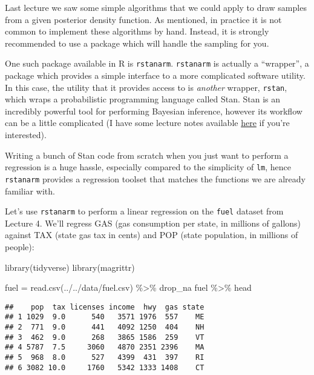\documentclass[
]{article}
\newenvironment{Shaded}{\begin{snugshade}}{\end{snugshade}}
\newcommand{\FunctionTok}[1]{\textcolor[rgb]{0.00,0.00,0.00}{#1}}
\newcommand{\NormalTok}[1]{#1}
\newcommand{\OtherTok}[1]{\textcolor[rgb]{0.56,0.35,0.01}{#1}}
\newcommand{\SpecialCharTok}[1]{\textcolor[rgb]{0.00,0.00,0.00}{#1}}
\newcommand{\StringTok}[1]{\textcolor[rgb]{0.31,0.60,0.02}{#1}}
\begin{document}
Last lecture we saw some simple algorithms that we could apply to draw
samples from a given posterior density function. As mentioned, in
practice it is not common to implement these algorithms by hand.
Instead, it is strongly recommended to use a package which will handle
the sampling for you.

One such package available in R is \texttt{rstanarm}. \texttt{rstanarm}
is actually a ``wrapper'', a package which provides a simple interface
to a more complicated software utility. In this case, the utility that
it provides access to is \emph{another} wrapper, \texttt{rstan}, which
wraps a probabilistic programming language called Stan. Stan is an
incredibly powerful tool for performing Bayesian inference, however its
workflow can be a little complicated (I have some lecture notes
available
\href{https://github.com/proof-by-accident/stan_lectures}{here} if
you're interested).

Writing a bunch of Stan code from scratch when you just want to perform
a regression is a huge hassle, especially compared to the simplicity of
\texttt{lm}, hence \texttt{rstanarm} provides a regression toolset that
matches the functions we are already familiar with.

Let's use \texttt{rstanarm} to perform a linear regression on the
\texttt{fuel} dataset from Lecture 4. We'll regress GAS (gas consumption
per state, in millions of gallons) against TAX (state gas tax in cents)
and POP (state population, in millions of people):

\begin{Shaded}
\begin{Highlighting}[]
\FunctionTok{library}\NormalTok{(tidyverse)}
\FunctionTok{library}\NormalTok{(magrittr)}

\NormalTok{fuel }\OtherTok{=} \FunctionTok{read.csv}\NormalTok{(}\StringTok{\textquotesingle{}../../data/fuel.csv\textquotesingle{}}\NormalTok{) }\SpecialCharTok{\%\textgreater{}\%}\NormalTok{ drop\_na}
\NormalTok{fuel }\SpecialCharTok{\%\textgreater{}\%}\NormalTok{ head}
\end{Highlighting}
\end{Shaded}

\begin{verbatim}
##    pop  tax licenses income  hwy  gas state
## 1 1029  9.0      540   3571 1976  557    ME
## 2  771  9.0      441   4092 1250  404    NH
## 3  462  9.0      268   3865 1586  259    VT
## 4 5787  7.5     3060   4870 2351 2396    MA
## 5  968  8.0      527   4399  431  397    RI
## 6 3082 10.0     1760   5342 1333 1408    CT
\end{verbatim}
\end{document}
